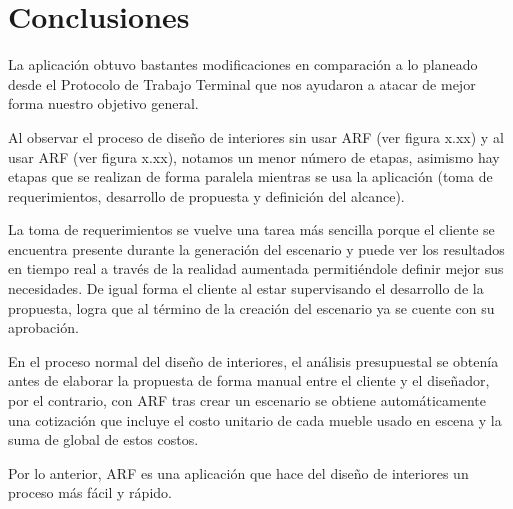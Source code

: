 \chapter{Conclusiones}

La aplicación obtuvo bastantes modificaciones en comparación a lo planeado desde el Protocolo de Trabajo Terminal que nos ayudaron a atacar de mejor forma nuestro objetivo general.\par
Al observar el proceso de diseño de interiores sin usar ARF (ver figura x.xx) y al usar ARF (ver figura x.xx), notamos un menor número de etapas, asimismo hay etapas que se realizan de forma paralela mientras se usa la aplicación (toma de requerimientos, desarrollo de propuesta y definición del alcance).\par
La toma de requerimientos se vuelve una tarea más sencilla porque el cliente se encuentra presente durante la generación del escenario y puede ver los resultados en tiempo real a través de la realidad aumentada permitiéndole definir mejor sus necesidades. De igual forma el cliente al estar supervisando el desarrollo de la propuesta, logra que al término de la creación del escenario ya se cuente con su aprobación.\par
En el proceso normal del diseño de interiores, el análisis presupuestal se obtenía antes de elaborar la propuesta de forma manual entre el cliente y el diseñador, por el contrario, con ARF tras crear un escenario se obtiene automáticamente una cotización que incluye el costo unitario de cada mueble usado en escena y la suma de global de estos costos.\par
Por lo anterior, ARF es una aplicación que hace del diseño de interiores un proceso más fácil y rápido.